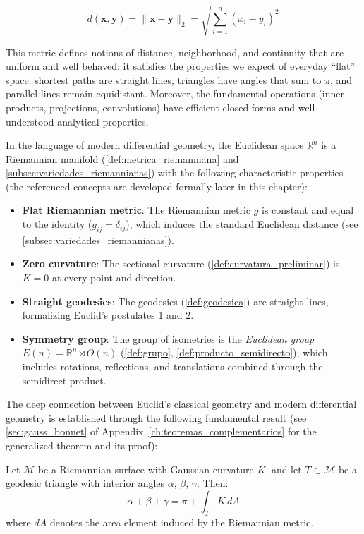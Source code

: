 \[
d(\mathbf{x}, \mathbf{y}) = \|\mathbf{x} - \mathbf{y}\|_2 = \sqrt{\sum_{i=1}^n (x_i - y_i)^2}
\]

This metric defines notions of distance, neighborhood, and continuity that are uniform and well behaved: it satisfies the properties we expect of everyday ``flat'' space: shortest paths are straight lines, triangles have angles that sum to $\pi$, and parallel lines remain equidistant. Moreover, the fundamental operations (inner products, projections, convolutions) have efficient closed forms and well-understood analytical properties.

In the language of modern differential geometry, the Euclidean space $\mathbb{R}^n$ is a Riemannian manifold (\autoref{def:metrica_riemanniana} and \autoref{subsec:variedades_riemannianas}) with the following characteristic properties (the referenced concepts are developed formally later in this chapter):

\begin{itemize}
    \item \textbf{Flat Riemannian metric}: The Riemannian metric $g$ is constant and equal to the identity ($g_{ij} = \delta_{ij}$), which induces the standard Euclidean distance (see \autoref{subsec:variedades_riemannianas}).
    \item \textbf{Zero curvature}: The sectional curvature (\autoref{def:curvatura_preliminar}) is $K = 0$ at every point and direction.
    \item \textbf{Straight geodesics}: The geodesics (\autoref{def:geodesica}) are straight lines, formalizing Euclid's postulates 1 and 2.
    \item \textbf{Symmetry group}: The group of isometries is the \textit{Euclidean group} $E(n) = \mathbb{R}^n \rtimes O(n)$ (\autoref{def:grupo}, \autoref{def:producto_semidirecto}), which includes rotations, reflections, and translations combined through the semidirect product.
\end{itemize}

The deep connection between Euclid's classical geometry and modern differential geometry is established through the following fundamental result (see \autoref{sec:gauss_bonnet} of Appendix~\ref{ch:teoremas_complementarios} for the generalized theorem and its proof):

\begin{theorem}\label{thm:gauss_bonnet_triangulo}
Let $\mathcal{M}$ be a Riemannian surface with Gaussian curvature $K$, and let $T \subset \mathcal{M}$ be a geodesic triangle with interior angles $\alpha$, $\beta$, $\gamma$. Then:
\begin{equation}\label{eq:gauss_bonnet_triangulo}
\alpha + \beta + \gamma = \pi + \int_T K \, dA
\end{equation}
where $dA$ denotes the area element induced by the Riemannian metric.
\end{theorem}

